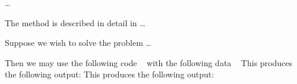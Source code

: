 \documentclass{galahad}
\begin{document}

\galmethod
\ldots

\galreference
The method is described in detail in \ldots


\galexample
Suppose we wish to solve the problem \ldots

\noindent
Then we may use the following code
{\tt \small
\VerbatimInput{\packageexample}
}
\noindent
with the following data
{\tt \small
\VerbatimInput{\packagedata}
}
\noindent
This produces the following output:
This produces the following output:
{\tt \small
\VerbatimInput{\packageresults}
}
\noindent
\end{document}
